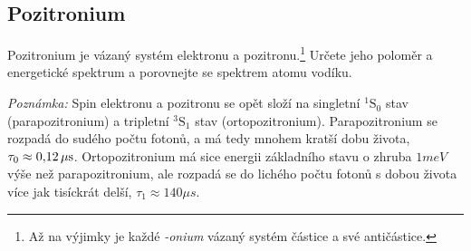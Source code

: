     \subsection{Pozitronium}
        Pozitronium je vázaný systém elektronu a pozitronu.\footnote{Až na výjimky je každé \emph{-onium} vázaný systém částice a své antičástice.}
        Určete jeho poloměr a energetické spektrum a porovnejte se spektrem atomu vodíku.

        \emph{Poznámka:} Spin elektronu a pozitronu se opět složí na singletní $^{1}\mathrm{S}_{0}$ stav (parapozitronium) a tripletní $^{3}\mathrm{S}_{1}$ stav (ortopozitronium).
        Parapozitronium se rozpadá do sudého počtu fotonů, a má tedy mnohem kratší dobu života, $\tau_{0}\approx0,\!12\,\mathrm{{\mu s}}$.
        Ortopozitronium má sice energii základního stavu o zhruba $1\unit{meV}$ výše než parapozitronium, ale rozpadá se do lichého počtu fotonů s dobou života více jak tisíckrát delší, $\tau_{1}\approx140\unit{\mu s}$.

